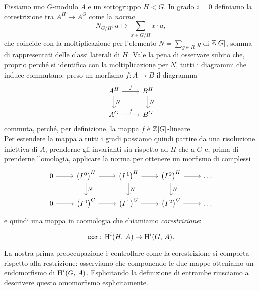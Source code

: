 \begin{definition}[Corestrizione]
Fissiamo uno $ G $-modulo $ A $ e un sottogruppo $ H < G $. In grado $ i = 0 $ definiamo la corestrizione tra $ A^H \to A^G $  come la \emph{norma}
\[N_{G/H} \colon a \mapsto \sum_{x \in G/H} x \cdot a, \]
che coincide con la moltiplicazione per l'elemento $ N = \sum_{g \in R} \, g $ di $ \mathbb{Z}[G] $, somma di rappresentati delle classi laterali di $ H $. Vale la pena di osservare subito che, proprio perché si identifica con la moltiplicazione per $ N $, tutti i diagrammi che induce commutano: preso un morfismo $ f \colon A \to B $ il diagramma
\[\begin{tikzcd}
A^H \rar["f"] \dar{N} 
& B^H \arrow[d, "N"]\\
A^G \rar["f"]
& B^G
\end{tikzcd}\] 
commuta, perché, per definizione, la mappa $ f $ è $ \mathbb{Z}[G] $-lineare. \todo[sistemare] \\

Per estendere la mappa a tutti i gradi possiamo quindi partire da una risoluzione iniettiva di $ A $, prenderne gli invarianti sia rispetto ad $ H $ che a $ G $ e, prima di prenderne l'omologia, applicare la norma per ottenere un morfismo di complessi
\[\begin{tikzcd}
0 \rar
& \left(I^{\,0}\right)^H \rar \dar["N"]
& \left(I^{\,1}\right)^H \rar \dar["N"]
& \left(I^{\,2}\right)^H \rar \dar["N"]
& \dots \\
0 \rar
& \left(I^{\,0}\right)^{G} \rar
& \left(I^{\,1}\right)^{G} \rar
& \left(I^{\,2}\right)^{G} \rar
& \dots
\end{tikzcd} \]
e quindi una mappa in coomologia che chiamiamo \emph{corestrizione}:

\[ \operatorname{\mathtt{cor}} \colon \operatorname{H}^i(H, \, A) \to \operatorname{H}^i(G, \, A). \]

\end{definition}

La nostra prima preoccupazione è controllare come la corestrizione si comporta rispetto alla restrizione: osserviamo che componendo le due mappe otteniamo un endomorfismo di $ \operatorname{H}^i(G, \, A) $. Esplicitando la definizione di entrambe riusciamo a descrivere questo omomorfismo esplicitamente.

